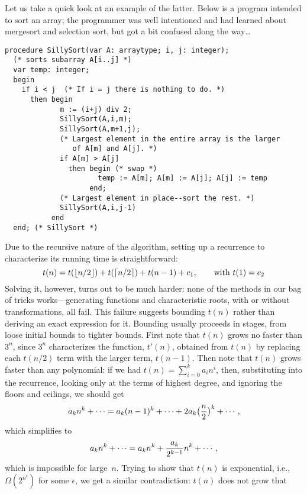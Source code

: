 \documentclass{article}
\begin{document}
Let us take a quick look at an example of the latter.  Below is a
program intended to sort an array; the programmer was well intentioned
and had learned about mergesort and selection sort, but got a bit confused
along the way\dots
\begin{verbatim}
procedure SillySort(var A: arraytype; i, j: integer);
  (* sorts subarray A[i..j] *)
  var temp: integer;
  begin
    if i < j  (* If i = j there is nothing to do. *)
      then begin
             m := (i+j) div 2;
             SillySort(A,i,m);
             SillySort(A,m+1,j);
             (* Largest element in the entire array is the larger
                of A[m] and A[j]. *)
             if A[m] > A[j]
               then begin (* swap *)
                      temp := A[m]; A[m] := A[j]; A[j] := temp
                    end;
             (* Largest element in place--sort the rest. *)
             SillySort(A,i,j-1)
           end
  end; (* SillySort *)
\end{verbatim}
Due to the recursive nature of the algorithm, setting up a recurrence
to characterize its running time is straightforward:
  $$t(n) = t(\lfloor {n / 2} \rfloor) + t(\lceil {n / 2} \rceil) + t(n-1) + c_1,\qquad\hbox{\rm with }t(1) = c_2$$
Solving it, however, turns out to be much harder: none of the methods in our
bag of tricks works---generating functions and characteristic roots, with or
without transformations, all fail.  This failure suggests bounding $t(n)$
rather than deriving an exact expression for it.  Bounding usually proceeds
in stages, from loose initial bounds to tighter bounds.
First note that $t(n)$ grows no faster than $3^n$\negthinspace,
since $3^n$ characterizes the function, $t'(n)$, obtained
from $t(n)$ by replacing each $t(n/2)$ term with the larger term,
$t(n-1)$.  Then note that $t(n)$ grows faster than any polynomial:
if we had $t(n) = \sum_{i=0}^k a_i n^i$\negthinspace,
then, substituting into the recurrence, looking only at the terms
of highest degree, and ignoring the floors and ceilings, we should get
\begin{displaymath}
  a_k n^k + \cdots = a_k (n-1)^k + \cdots + 2a_k \bigl({n \over 2}\bigr)^k + \cdots,
\end{displaymath}
which simplifies to
\begin{displaymath}
  a_k n^k + \cdots = a_k n^k + {a_k \over 2^{k-1}} n^k + \cdots,
\end{displaymath}
which is impossible for large~$n$.
Trying to show that $t(n)$ is exponential, i.e., $\Omega(2^{n^{\epsilon}})$
for some $\epsilon$, we get a similar contradiction: $t(n)$ does not grow that
\end{document}
